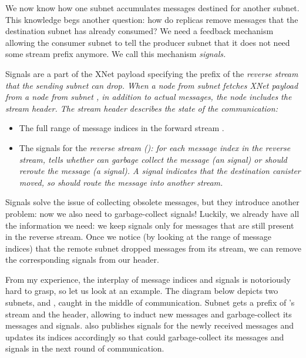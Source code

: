 \documentclass{article}
\begin{document}
We now know how one subnet accumulates messages destined for another subnet.
This knowledge begs another question: how do replicas remove messages that the destination subnet has already consumed?
We need a feedback mechanism allowing the consumer subnet to tell the producer subnet that it does not need some stream prefix anymore.
We call this mechanism \em{signals}.

Signals are a part of the XNet payload specifying the prefix of the \em{reverse} stream that the sending subnet can drop.
When a node from subnet  fetches XNet payload from a node from subnet , in addition to actual messages, the  node includes the \em{stream header}.
The stream header describes the state of the  communication:

\begin{itemize}
  \item
    The full range of message indices in the forward stream .
  \item
    The signals for the \em{reverse} stream (): for each message index in the reverse stream,  tells whether  can garbage collect the message (an  signal) or should reroute the message (a  signal).
    A  signal indicates that the destination canister moved, so  should route the message into another stream.
\end{itemize}

Signals solve the issue of collecting obsolete messages, but they introduce another problem: now we also need to garbage-collect signals!
Luckily, we already have all the information we need: we keep signals only for messages that are still present in the reverse stream.
Once we notice (by looking at the range of message indices) that the remote subnet dropped messages from its stream, we can remove the corresponding signals from our header.

From my experience, the interplay of message indices and signals is notoriously hard to grasp, so let us look at an example.
The diagram below depicts two subnets,  and , caught in the middle of communication.
Subnet  gets a prefix of 's stream and the header, allowing  to induct new messages and garbage-collect its messages and signals.
 also publishes signals for the newly received messages and updates its indices accordingly so that  could garbage-collect its messages and signals in the next round of communication.
\end{document}
